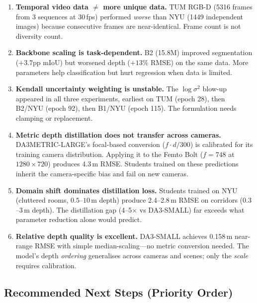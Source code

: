 \documentclass[11pt,a4paper]{article}
\begin{document}
\begin{enumerate}
  \item \textbf{Temporal video data $\neq$ more unique data.}
    TUM RGB-D (5316 frames from 3 sequences at 30\,fps) performed
    \emph{worse} than NYU (1449 independent images) because consecutive
    frames are near-identical. Frame count is not diversity count.

  \item \textbf{Backbone scaling is task-dependent.}
    B2 (15.8M) improved segmentation ($+3.7$pp mIoU) but worsened
    depth ($+13\%$ RMSE) on the same data. More parameters help
    classification but hurt regression when data is limited.

  \item \textbf{Kendall uncertainty weighting is unstable.}
    The $\log \sigma^2$ blow-up appeared in all three experiments,
    earliest on TUM (epoch 28), then B2/NYU (epoch 92), then B1/NYU
    (epoch 115). The formulation needs clamping or replacement.

  \item \textbf{Metric depth distillation does not transfer across cameras.}
    DA3METRIC-LARGE's focal-based conversion ($f \cdot d / 300$) is
    calibrated for its training camera distribution. Applying it to the
    Femto Bolt ($f = 748$ at $1280 \times 720$) produces 4.3\,m RMSE.
    Students trained on these predictions inherit the camera-specific
    bias and fail on new cameras.

  \item \textbf{Domain shift dominates distillation loss.}
    Students trained on NYU (cluttered rooms, $0.5$--$10$\,m depth)
    produce 2.4--2.8\,m RMSE on corridors ($0.3$--$3$\,m depth).
    The distillation gap (4--5$\times$ vs DA3-SMALL) far exceeds
    what parameter reduction alone would predict.

  \item \textbf{Relative depth quality is excellent.}
    DA3-SMALL achieves 0.158\,m near-range RMSE with simple
    median-scaling---no metric conversion needed. The model's
    depth \emph{ordering} generalises across cameras and scenes;
    only the \emph{scale} requires calibration.
\end{enumerate}

\subsection{Recommended Next Steps (Priority Order)}
\end{document}
